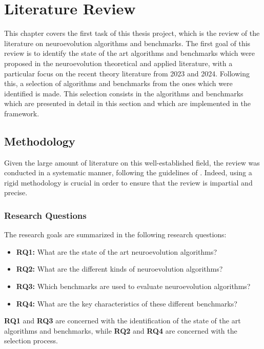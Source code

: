 \chapter{Literature Review}
\label{chap:review}

This chapter covers the first task of this thesis project, which is the review of the literature on neuroevolution algorithms and benchmarks.
The first goal of this review is to identify the state of the art algorithms and benchmarks which were proposed in the neuroevolution theoretical and applied literature, with a particular
focus on the recent theory literature from 2023 and 2024. Following this, a selection of algorithms and benchmarks from the ones which were identified is made.
This selection consists in the algorithms and benchmarks which are presented in detail in this section and which are implemented in the framework.

\section{Methodology}

Given the large amount of literature on this well-established field, the review was conducted in a systematic manner, following the guidelines of \cite{snowballing,systematic_review}.
Indeed, using a rigid methodology is crucial in order to ensure that the review is impartial and precise.

\subsection{Research Questions}

The research goals are summarized in the following research questions:

\begin{itemize}
    \item \textbf{RQ1:} What are the state of the art neuroevolution algorithms?
    \item \textbf{RQ2:} What are the different kinds of neuroevolution algorithms?
    \item \textbf{RQ3:} Which benchmarks are used to evaluate neuroevolution algorithms?
    \item \textbf{RQ4:} What are the key characteristics of these different benchmarks?
\end{itemize}

\textbf{RQ1} and \textbf{RQ3} are concerned with the identification of the state of the art algorithms and benchmarks, while \textbf{RQ2} and \textbf{RQ4} are concerned
with the selection process.

